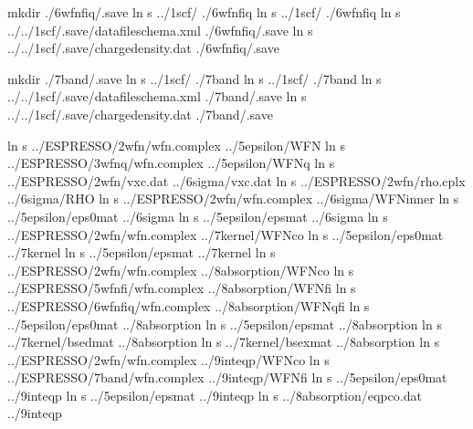 \documentclass[a4paper,12pt,english]{sphinxmanual}
\begin{document}
\begin{sphinxVerbatim}[commandchars=\\\{\}]
mkdir ./6\PYGZhy{}wfn\PYGZus{}fiq/.save
ln \PYGZhy{}s ../1\PYGZhy{}scf/  ./6\PYGZhy{}wfn\PYGZus{}fiq
ln \PYGZhy{}s ../1\PYGZhy{}scf/  ./6\PYGZhy{}wfn\PYGZus{}fiq
ln \PYGZhy{}s ../../1\PYGZhy{}scf/.save/data\PYGZhy{}file\PYGZhy{}schema.xml ./6\PYGZhy{}wfn\PYGZus{}fiq/.save
ln \PYGZhy{}s ../../1\PYGZhy{}scf/.save/charge\PYGZhy{}density.dat ./6\PYGZhy{}wfn\PYGZus{}fiq/.save

mkdir ./7\PYGZhy{}band/.save
ln \PYGZhy{}s ../1\PYGZhy{}scf/  ./7\PYGZhy{}band
ln \PYGZhy{}s ../1\PYGZhy{}scf/  ./7\PYGZhy{}band
ln \PYGZhy{}s ../../1\PYGZhy{}scf/.save/data\PYGZhy{}file\PYGZhy{}schema.xml ./7\PYGZhy{}band/.save
ln \PYGZhy{}s ../../1\PYGZhy{}scf/.save/charge\PYGZhy{}density.dat ./7\PYGZhy{}band/.save

ln \PYGZhy{}s ../ESPRESSO/2\PYGZhy{}wfn/wfn.complex ../5\PYGZhy{}epsilon/WFN
ln \PYGZhy{}s ../ESPRESSO/3\PYGZhy{}wfnq/wfn.complex ../5\PYGZhy{}epsilon/WFNq
ln \PYGZhy{}s ../ESPRESSO/2\PYGZhy{}wfn/vxc.dat ../6\PYGZhy{}sigma/vxc.dat
ln \PYGZhy{}s ../ESPRESSO/2\PYGZhy{}wfn/rho.cplx ../6\PYGZhy{}sigma/RHO
ln \PYGZhy{}s ../ESPRESSO/2\PYGZhy{}wfn/wfn.complex ../6\PYGZhy{}sigma/WFN\PYGZus{}inner
ln \PYGZhy{}s ../5\PYGZhy{}epsilon/eps0mat ../6\PYGZhy{}sigma
ln \PYGZhy{}s ../5\PYGZhy{}epsilon/epsmat ../6\PYGZhy{}sigma
ln \PYGZhy{}s ../ESPRESSO/2\PYGZhy{}wfn/wfn.complex ../7\PYGZhy{}kernel/WFN\PYGZus{}co
ln \PYGZhy{}s ../5\PYGZhy{}epsilon/eps0mat ../7\PYGZhy{}kernel
ln \PYGZhy{}s ../5\PYGZhy{}epsilon/epsmat ../7\PYGZhy{}kernel
ln \PYGZhy{}s ../ESPRESSO/2\PYGZhy{}wfn/wfn.complex ../8\PYGZhy{}absorption/WFN\PYGZus{}co
ln \PYGZhy{}s ../ESPRESSO/5\PYGZhy{}wfn\PYGZus{}fi/wfn.complex ../8\PYGZhy{}absorption/WFN\PYGZus{}fi
ln \PYGZhy{}s ../ESPRESSO/6\PYGZhy{}wfn\PYGZus{}fiq/wfn.complex ../8\PYGZhy{}absorption/WFNq\PYGZus{}fi
ln \PYGZhy{}s ../5\PYGZhy{}epsilon/eps0mat ../8\PYGZhy{}absorption
ln \PYGZhy{}s ../5\PYGZhy{}epsilon/epsmat ../8\PYGZhy{}absorption
ln \PYGZhy{}s ../7\PYGZhy{}kernel/bsedmat ../8\PYGZhy{}absorption
ln \PYGZhy{}s ../7\PYGZhy{}kernel/bsexmat ../8\PYGZhy{}absorption
ln \PYGZhy{}s ../ESPRESSO/2\PYGZhy{}wfn/wfn.complex ../9\PYGZhy{}inteqp/WFN\PYGZus{}co
ln \PYGZhy{}s ../ESPRESSO/7\PYGZhy{}band/wfn.complex ../9\PYGZhy{}inteqp/WFN\PYGZus{}fi
ln \PYGZhy{}s ../5\PYGZhy{}epsilon/eps0mat ../9\PYGZhy{}inteqp
ln \PYGZhy{}s ../5\PYGZhy{}epsilon/epsmat ../9\PYGZhy{}inteqp
ln \PYGZhy{}s ../8\PYGZhy{}absorption/eqp\PYGZus{}co.dat ../9\PYGZhy{}inteqp
\end{sphinxVerbatim}
\end{document}
